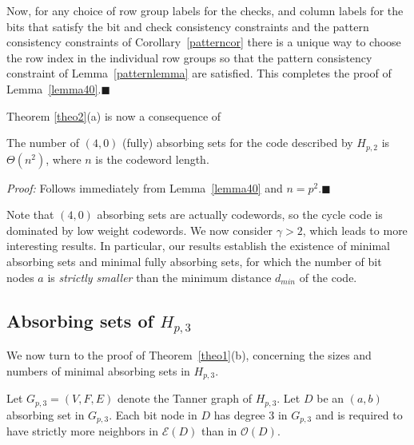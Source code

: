 Now, for any choice of row group labels for the checks, and column
labels for the bits that satisfy the bit and check consistency
constraints and the pattern consistency constraints of
Corollary~\ref{patterncor} there is a unique way to choose the row
index in the individual row groups so that the pattern consistency
constraint of Lemma~\ref{patternlemma} are satisfied. This completes
the proof of Lemma~\ref{lemma40}.\hfill$\blacksquare$


 Theorem \ref{theo2}(a) is now a consequence of
\begin{corollary} The number of $(4,0)$ (fully) absorbing sets for
the code described by $H_{p,2}$ is $\Theta(n^{2})$, where $n$ is
the codeword length.
\end{corollary}
\noindent \textit{Proof:} Follows immediately from
Lemma~\ref{lemma40} and $n=p^2$.\hfill$\blacksquare$

Note that $(4,0)$ absorbing sets are actually codewords, so  the
cycle code is dominated by low weight codewords. We now consider
$\gamma
> 2$, which leads to more interesting results. In particular, our results establish the
existence of minimal absorbing sets and minimal fully absorbing
sets, for which the number of bit nodes $a$ is \emph{strictly
smaller} than the minimum distance $d_{min}$ of the code.

\subsection{Absorbing sets of $H_{p,3}$}\label{theo12}

We now turn to the proof of Theorem~\ref{theo1}(b), concerning the
sizes and numbers of minimal absorbing sets in $H_{p,3}$.


Let $G_{p,3}=(V,F,E)$ denote the Tanner graph of $H_{p,3}$. Let
$D$ be an $(a,b)$ absorbing set in $G_{p,3}$. Each bit node in $D$
has degree $3$ in $G_{p,3}$ and is required to have strictly more
neighbors in $\mathcal{E}(D)$ than in $\mathcal{O}(D)$.

